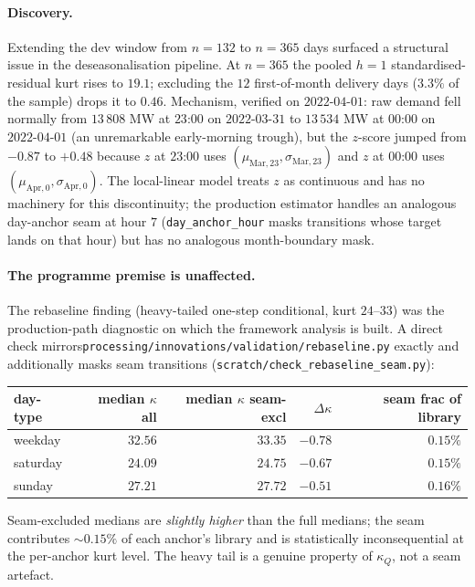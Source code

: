 \documentclass[11pt]{article}
\begin{document}
\paragraph{Discovery.} Extending the dev window from \(n = 132\) to
\(n = 365\) days surfaced a structural issue in the deseasonalisation
pipeline. At \(n = 365\) the pooled \(h = 1\) standardised-residual
kurt rises to \(19.1\); excluding the \(12\) first-of-month
delivery days (\(3.3\%\) of the sample) drops it to \(0.46\).
Mechanism, verified on \(2022\text{-}04\text{-}01\): raw demand
fell normally from \(13\,808\) MW at \(23\):\(00\) on
\(2022\text{-}03\text{-}31\) to \(13\,534\) MW at \(00\):\(00\) on
\(2022\text{-}04\text{-}01\) (an unremarkable early-morning trough),
but the \(z\)-score jumped from \(-0.87\) to \(+0.48\) because
\(z\) at \(23\):\(00\) uses
\((\mu_{\mathrm{Mar},23}, \sigma_{\mathrm{Mar},23})\) and \(z\)
at \(00\):\(00\) uses \((\mu_{\mathrm{Apr},0}, \sigma_{\mathrm{Apr},0})\).
The local-linear model treats \(z\) as continuous and has no
machinery for this discontinuity; the production estimator handles
an analogous day-anchor seam at hour \(7\)
(\texttt{day\_anchor\_hour} masks transitions whose target lands on
that hour) but has no analogous month-boundary mask.

\paragraph{The programme premise is unaffected.} The rebaseline
finding (heavy-tailed one-step conditional, kurt \(24\)--\(33\)) was
the production-path diagnostic on which the framework analysis is
built. A direct check
mirrors\texttt{processing/innovations/}\texttt{validation/}\texttt{rebaseline.py}
exactly and additionally masks seam transitions
(\texttt{scratch/check\_rebaseline\_seam.py}):
\begin{center}\small
\begin{tabular}{l r r r r}
\toprule
day-type & median \(\kappa\) all & median \(\kappa\) seam-excl & \(\Delta\kappa\) & seam frac of library \\
\midrule
weekday  & \(32.56\) & \(33.35\) & \(-0.78\) & \(0.15\%\) \\
saturday & \(24.09\) & \(24.75\) & \(-0.67\) & \(0.15\%\) \\
sunday   & \(27.21\) & \(27.72\) & \(-0.51\) & \(0.16\%\) \\
\bottomrule
\end{tabular}
\end{center}
Seam-excluded medians are \emph{slightly higher} than the full
medians; the seam contributes \(\sim 0.15\%\) of each anchor's
library and is statistically inconsequential at the per-anchor kurt
level. The heavy tail is a genuine property of \(\kappa_Q\), not a
seam artefact.
\end{document}
